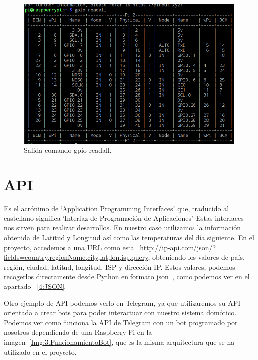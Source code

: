 \begin{figure}[h]
    \centering
    \includegraphics[width=.9\textwidth]{img/fotos/gpioReadall.png}
    \caption[Salida comando gpio readall]{Salida comando gpio readall.} \label{Img:3.GPIOReadAll}
\end{figure}


\section{API}\label{concepto:API}
Es el acrónimo de ‘Application Programming Interfaces’ que, traducido al castellano significa ‘Interfaz de Programación de Aplicaciones’. Estas interfaces nos sirven para realizar desarrollos. En nuestro caso utilizamos la información obtenida de Latitud y Longitud así como las temperaturas del día siguiente.
En el proyecto, accedemos a una URL como esta ~\url{http://ip-api.com/json/?fields=country,regionName,city,lat,lon,isp,query}, obteniendo los valores de país, región, ciudad, latitud, longitud, ISP y dirección IP.
Estos valores, podemos recogerlos directamente desde Python en formato json~\cite{misc:Json}, como podemos ver en el apartado ~\ref{4:JSON}.

Otro ejemplo de API podemos verlo en Telegram, ya que utilizaremos su API orientada a crear bots para poder interactuar con nuestro sistema domótico. Podemos ver como funciona la API de Telegram con un bot programado por nosotros dependiendo de una Raspberry Pi en la imagen~\ref{Img:3.FuncionamientoBot}, que es la misma arquitectura que se ha utilizado en el proyecto.

